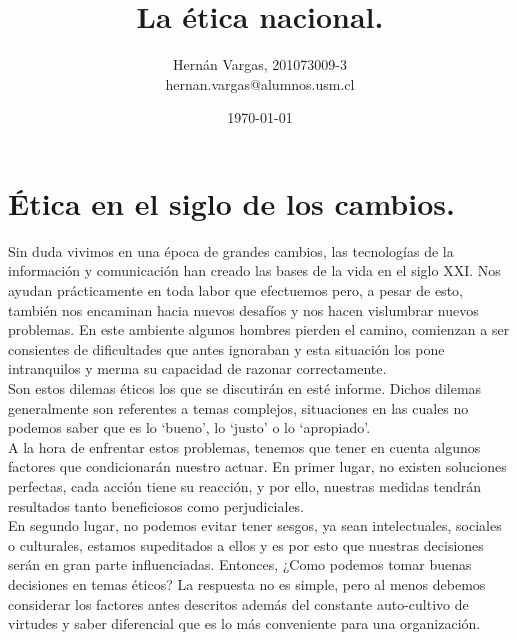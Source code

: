 \documentclass[spanish, fleqn]{article}
\title{ La ética nacional.}
\author{Hernán Vargas, 201073009-3 \\ hernan.vargas@alumnos.usm.cl}
\date{\today}
\begin{document}
	\maketitle
	\thispagestyle{empty}

	\thispagestyle{fancy}
	\section{Ética en el siglo de los cambios.}
	Sin duda vivimos en una época de grandes cambios, las tecnologías de la
	información y comunicación han creado las bases de la vida en el siglo XXI.
	Nos ayudan prácticamente en toda labor que efectuemos pero, a pesar de esto,
	también nos encaminan hacia nuevos desafíos y nos hacen vislumbrar nuevos
	problemas. En este ambiente algunos hombres pierden el camino, comienzan a 
	ser consientes de dificultades que antes ignoraban y esta situación los pone
	intranquilos y merma su capacidad de razonar correctamente.\\
	Son estos dilemas éticos los que se discutirán en esté informe. Dichos
	dilemas generalmente son referentes a temas complejos, situaciones en las
	cuales no podemos saber que es lo `bueno', lo `justo' o lo `apropiado'.\\
	A la hora de enfrentar estos problemas, tenemos que tener en cuenta algunos
	factores que condicionarán nuestro actuar. En primer lugar, no existen
	soluciones perfectas, cada acción tiene su reacción, y por ello, nuestras
	medidas tendrán resultados tanto beneficiosos como perjudiciales.\\
	En segundo lugar, no podemos evitar tener sesgos, ya sean intelectuales, 
	sociales o culturales, estamos supeditados a ellos y es por esto que
	nuestras decisiones serán en gran parte influenciadas. Entonces, 
	¿Como podemos tomar buenas decisiones en temas éticos? La respuesta no es
	simple, pero al menos debemos considerar los factores antes descritos además
	del constante auto-cultivo de virtudes y saber diferencial que es lo más
	conveniente para una organización.
	
\end{document}
